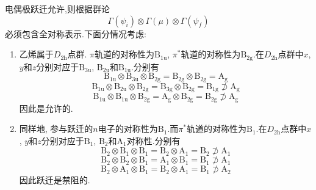 \documentclass{ctexart}
\begin{document}
\begin{solution}
    电偶极跃迁允许,则根据群论
    \[\Gamma(\psi_i)\otimes\Gamma(\mu)\otimes\Gamma(\psi_f)\]
    必须包含全对称表示.下面分情况考虑:
    \begin{enumerate}[label=\tbf{(\alph*)}]
        \item 乙烯属于$D_{2\text{h}}$点群. $\pi$轨道的对称性为$\text{B}_{1\text{u}}$, $\pi^\ast$轨道的对称性为$\text{B}_{2\text{g}}$.在$D_{2\text{h}}$点群中$x$, $y$和$z$分别对应于$\text{B}_{3\text{u}}$, $\text{B}_{2\text{u}}$和$\text{B}_{1\text{u}}$.分别有
        \[\text{B}_{1\text{u}}\otimes\text{B}_{3\text{u}}\otimes\text{B}_{2\text{g}}=\text{B}_{2\text{g}}\otimes\text{B}_{2\text{g}}=\text{A}_{\text{g}}\]
        \[\text{B}_{1\text{u}}\otimes\text{B}_{2\text{u}}\otimes\text{B}_{2\text{g}}=\text{B}_{3\text{g}}\otimes\text{B}_{2\text{g}}=\text{B}_{1\text{g}}\nsupset\text{A}_{\text{g}}\]
        \[\text{B}_{1\text{u}}\otimes\text{B}_{1\text{u}}\otimes\text{B}_{2\text{g}}=\text{A}_{\text{g}}\otimes\text{B}_{2\text{g}}=\text{B}_{2\text{g}}\nsupset\text{A}_{\text{g}}\]
        因此是允许的.
        \item 同样地, 参与跃迁的$n$电子的对称性为$\text{B}_1$.而$\pi^\ast$轨道的对称性为$\text{B}_1$.在$D_{2\text{h}}$点群中$x$, $y$和$z$分别对应于$\text{B}_{1}$, $\text{B}_{2}$和$\text{A}_{1}$对称性.分别有
        \[\text{B}_2\otimes\text{B}_1\otimes\text{B}_1=\text{B}_2\otimes\text{A}_1=\text{B}_2\nsupset\text{A}_1\]
        \[\text{B}_2\otimes\text{B}_2\otimes\text{B}_1=\text{A}_1\otimes\text{B}_1=\text{B}_1\nsupset\text{A}_1\]
        \[\text{B}_2\otimes\text{A}_1\otimes\text{B}_1=\text{B}_2\otimes\text{A}_1=\text{B}_1\nsupset\text{A}_2\]
        因此跃迁是禁阻的.
    \end{enumerate}
\end{solution}
\end{document}

